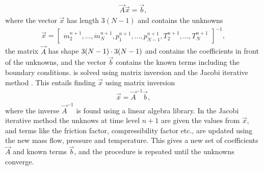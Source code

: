 \begin{align}
    \vec A \vec x = \vec b
, \label{eq:matrixEquation}
\end{align}
where the vector $\vec x$ has length $3(N-1)$ and contains the unknowns
\begin{align}
    \vec x = 
    \begin{bmatrix}
        \dot m^{n+1}_2, \dots, \dot m^{n+1}_N,
        p^{n+1}_1, \dots, p^{n+1}_{N-1}, 
        T^{n+1}_2, \dots, T^{n+1}_N
    \end{bmatrix}^{-1}
,
\end{align}
the matrix $\vec A$ has shape $3(N-1)\oldtimes 3(N-1)$ and contains the coefficients in front of the unknowns, and the vector $\vec b$ contains the known terms including the boundary conditions.  is solved using matrix inversion and the Jacobi iterative method \cite{Ferziger2002Computational}. This entails finding $\vec x$ using matrix inversion
\begin{align}
    \vec x = \vec A^{-1} \vec b
,
\end{align}
where the inverse $\vec A^{-1}$ is found using a linear algebra library. In the Jacobi iterative method the unknows at time level $n+1$ are given the values from $\vec x$, and terms like the friction factor, compressibility factor etc., are updated using the new mass flow, pressure and temperature. This gives a new set of coefficients $\vec A$ and known terms $\vec b$, and the procedure is repeated until the unknowns converge.